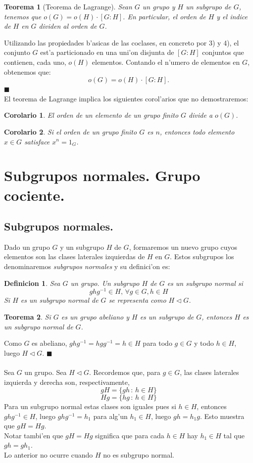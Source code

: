 \documentclass[a4paper,openright,12pt]{book}
\numberwithin{equation}{section} %
\newtheorem{teorema}{Teorema}[section] %
\newtheorem{corolario}{Corolario}[section] %
\newtheorem{definicion}{Definicion}[section] %
\newenvironment{proof}{\noindent{\it Demostracion:}}{\hfill$\blacksquare$} %
\begin{document}
\begin{teorema}[Teorema de Lagrange]
Sean $G$ un grupo y $H$ un subgrupo de $G$, tenemos que $o(G)=o(H)\cdot [G:H]$. En particular, el orden de $H$ y el indice de $H$ en $G$ dividen al orden de $G$.
\end{teorema}
\begin{proof}
Utilizando las propiedades b'asicas de las coclases, en concreto por 3) y 4), el conjunto $G$ est'a particionado en una uni'on disjunta de $[G:H]$ conjuntos que contienen, cada uno, $o(H)$ elementos. Contando el n'umero de elementos en $G$, obtenemos que:
\[
 o(G)=o(H)\cdot [G:H].
 \]
\end{proof}
\\
El teorema de Lagrange implica los siguientes corol'arios que no demostraremos:
\begin{corolario}
El orden de un elemento de un grupo finito $G$ divide a $o(G)$.
\end{corolario}
\begin{corolario}
Si el orden de un grupo finito $G$ es $n$, entonces todo elemento $x \in G$ satisface $x^{n}=1_{G}$.
\end{corolario}
\section{Subgrupos normales. Grupo cociente.}
\subsection{Subgrupos normales.}
Dado un grupo $G$ y un subgrupo $H$ de $G$, formaremos un nuevo grupo cuyos elementos son las clases laterales izquierdas de $H$ en $G$. Estos subgrupos los denominaremos \textit{subgrupos normales} y su definici'on es:
\begin{definicion}
Sea $G$ un grupo. Un subgrupo $H$ de $G$ es un subgrupo normal si
\[
ghg^{-1}\in H, \, \forall g\in G, h\in H
\]
Si $H$ es un subgrupo normal de $G$ se representa como $H \triangleleft G$.
\end{definicion}
\begin{teorema}
Si $G$ es un grupo abeliano y $H$ es un subgrupo de $G$, entonces $H$ es un subgrupo normal de $G$.
\end{teorema}
\begin{proof}
Como $G$ es abeliano, $ghg^{-1}=hgg^{-1}=h \in H$ para todo $g \in G$ y todo $h \in H$, luego $H \triangleleft G$.
\end{proof}
\\
\\
Sea $G$ un grupo. Sea $H \triangleleft G$. Recordemos que, para $g \in G$, las clases laterales izquierda y derecha son, respectivamente,
\[
gH=\{gh\,:\, h\in H\}
\]
\[
Hg=\{hg\,:\, h \in H\}
\]
Para un subgrupo normal estas clases son iguales pues si $h\in H$, entonces $ghg^{-1} \in H$, luego $ghg^{-1}=h_{1}$ para alg'un $h_{1} \in H$, luego $gh=h_{1}g$. Esto muestra que $gH=Hg$.\\
Notar tambi'en que $gH=Hg$ significa que para cada $h \in H$ hay $h_{1} \in H$ tal que $gh=gh_{1}$.\\
Lo anterior no ocurre cuando $H$ no es subgrupo normal.
\end{document}
